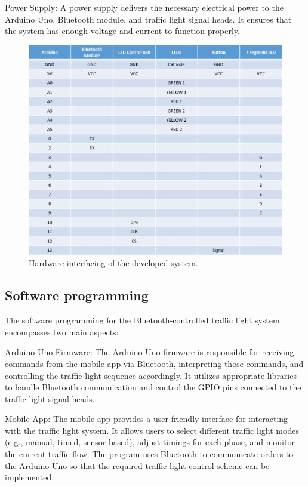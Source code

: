 \documentclass[conference, onecolumn]{IEEEtran}
\begin{document}
Power Supply: A power supply delivers the necessary electrical power to the Arduino Uno, Bluetooth module, and traffic light signal heads. It ensures that the system has enough voltage and current to function properly.\par
\begin{figure}[htbp]
\centerline{\includegraphics[width=6 in]{Table.jpg}}
\caption{Hardware interfacing of the developed system.}
\label{fig}
\end{figure}
\subsection{Software programming}

The software programming for the Bluetooth-controlled traffic light system encompasses two main aspects:

Arduino Uno Firmware: The Arduino Uno firmware is responsible for receiving commands from the mobile app via Bluetooth, interpreting those commands, and controlling the traffic light sequence accordingly. It utilizes appropriate libraries to handle Bluetooth communication and control the GPIO pins connected to the traffic light signal heads.\par

Mobile App: The mobile app provides a user-friendly interface for interacting with the traffic light system. It allows users to select different traffic light modes (e.g., manual, timed, sensor-based), adjust timings for each phase, and monitor the current traffic flow. The program uses Bluetooth to communicate orders to the Arduino Uno so that the required traffic light control scheme can be implemented.\par
\end{document}

